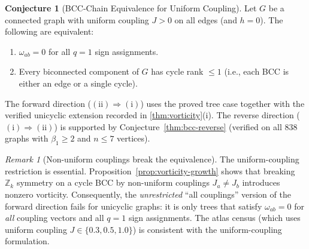 \documentclass[11pt]{article}
\theoremstyle{definition}
\newtheorem{conjecture}[theorem]{Conjecture}
\theoremstyle{remark}
\newtheorem{remark}[theorem]{Remark}
\newcommand{\vort}{\omega}
\newcommand{\betti}{\beta_1}
\begin{document}
\begin{conjecture}[BCC-Chain Equivalence for Uniform Coupling]
\label{cor:bcc-chain-complete}
Let $G$ be a connected graph with uniform coupling $J > 0$ on all edges
(and $h = 0$). The following are equivalent:
\begin{enumerate}
\item[(i)] $\vort_{ab} = 0$ for all $q = 1$ sign assignments.
\item[(ii)] Every biconnected component of $G$ has cycle rank $\leq 1$
  (i.e., each BCC is either an edge or a single cycle).
\end{enumerate}
The forward direction ($\mathrm{(ii) \Rightarrow (i)}$) uses the proved
tree case together with the verified unicyclic extension recorded in
\cref{thm:vorticity}(i). The reverse direction
($\mathrm{(i) \Rightarrow (ii)}$) is supported by
Conjecture~\ref{thm:bcc-reverse} (verified on all $838$ graphs
with $\betti \geq 2$ and $n \leq 7$ vertices).
\end{conjecture}

\begin{remark}[Non-uniform couplings break the equivalence]
\label{rem:nonuniform-vorticity}
The uniform-coupling restriction is essential.
Proposition~\ref{prop:vorticity-growth} shows that breaking
$\mathbb{Z}_k$ symmetry on a cycle BCC by non-uniform couplings
$J_a \neq J_b$ introduces nonzero vorticity.  Consequently,
the \emph{unrestricted} ``all couplings'' version of the forward
direction fails for unicyclic graphs: it is only trees that satisfy
$\vort_{ab} = 0$ for \emph{all} coupling vectors and all $q = 1$
sign assignments.  The atlas census (which uses uniform coupling
$J \in \{0.3, 0.5, 1.0\}$) is consistent with the uniform-coupling
formulation.
\end{remark}
\end{document}

